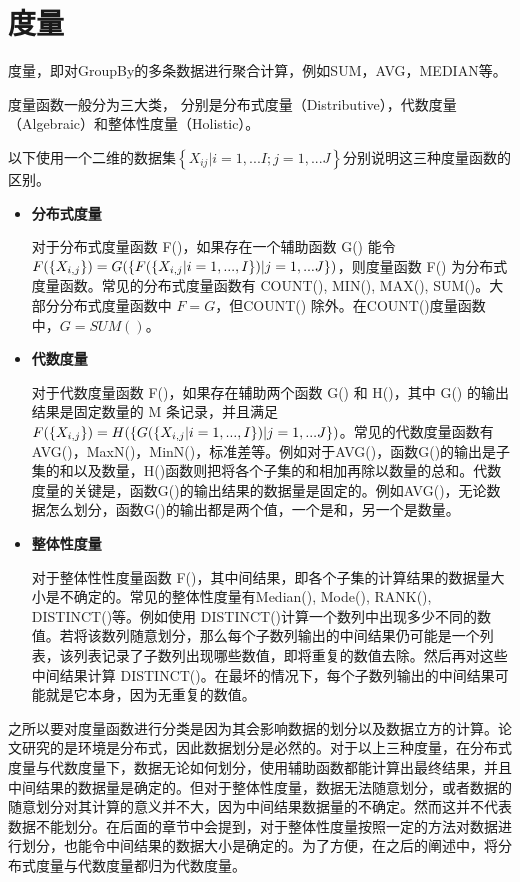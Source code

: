 \section{度量}

度量，即对GroupBy的多条数据进行聚合计算，例如SUM，AVG，MEDIAN等。

度量函数一般分为三大类， 分别是分布式度量（Distributive），代数度量（Algebraic）和整体性度量（Holistic）。

以下使用一个二维的数据集$\left\{ {X}_{ij}|i=1,...I; j=1,...J \right\}$分别说明这三种度量函数的区别。

\begin{itemize}

\item \textbf{分布式度量}

对于分布式度量函数 F()，如果存在一个辅助函数 G() 能令 $F(\text\{ {X}_{i,j} \text\}) = G(\text\{ F(\text\{ {X}_{i,j}|i=1,...,I \text\})|j=1,...J \text\})$，则度量函数 F() 为分布式度量函数。常见的分布式度量函数有 COUNT(), MIN(), MAX(), SUM()。大部分分布式度量函数中 $F=G$，但COUNT() 除外。在COUNT()度量函数中，$G=SUM()$。

\item \textbf{代数度量}

对于代数度量函数 F()，如果存在辅助两个函数 G() 和 H()，其中 G() 的输出结果是固定数量的 M 条记录，并且满足$F(\text\{ {X}_{i,j} \text\}) = H(\text\{ G(\text\{ {X}_{i,j}|i=1,...,I \text\})|j=1,...J \text\})$。常见的代数度量函数有AVG()，MaxN()，MinN()，标准差等。例如对于AVG()，函数G()的输出是子集的和以及数量，H()函数则把将各个子集的和相加再除以数量的总和。代数度量的关键是，函数G()的输出结果的数据量是固定的。例如AVG()，无论数据怎么划分，函数G()的输出都是两个值，一个是和，另一个是数量。

\item \textbf{整体性度量}

对于整体性性度量函数 F()，其中间结果，即各个子集的计算结果的数据量大小是不确定的。常见的整体性度量有Median(), Mode(), RANK(), DISTINCT()等。例如使用 DISTINCT()计算一个数列中出现多少不同的数值。若将该数列随意划分，那么每个子数列输出的中间结果仍可能是一个列表，该列表记录了子数列出现哪些数值，即将重复的数值去除。然后再对这些中间结果计算 DISTINCT()。在最坏的情况下，每个子数列输出的中间结果可能就是它本身，因为无重复的数值。

\end{itemize}

之所以要对度量函数进行分类是因为其会影响数据的划分以及数据立方的计算。论文研究的是环境是分布式，因此数据划分是必然的。对于以上三种度量，在分布式度量与代数度量下，数据无论如何划分，使用辅助函数都能计算出最终结果，并且中间结果的数据量是确定的。但对于整体性度量，数据无法随意划分，或者数据的随意划分对其计算的意义并不大，因为中间结果数据量的不确定。然而这并不代表数据不能划分。在后面的章节中会提到，对于整体性度量按照一定的方法对数据进行划分，也能令中间结果的数据大小是确定的。为了方便，在之后的阐述中，将分布式度量与代数度量都归为代数度量。

